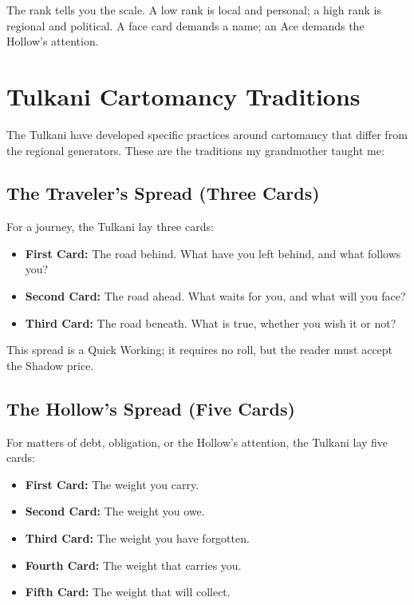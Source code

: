 \documentclass[11pt,letterpaper,twoside]{book}
\begin{document}
The rank tells you the scale. A low rank is local and personal; a high rank is regional and political. A face card demands a name; an Ace demands the Hollow's attention.

\section*{Tulkani Cartomancy Traditions}

The Tulkani have developed specific practices around cartomancy that differ from the regional generators. These are the traditions my grandmother taught me:

\subsection*{The Traveler's Spread (Three Cards)}

For a journey, the Tulkani lay three cards:
\begin{itemize}
    \item \textbf{First Card:} The road behind. What have you left behind, and what follows you?
    \item \textbf{Second Card:} The road ahead. What waits for you, and what will you face?
    \item \textbf{Third Card:} The road beneath. What is true, whether you wish it or not?
\end{itemize}

This spread is a Quick Working; it requires no roll, but the reader must accept the Shadow price.

\subsection*{The Hollow's Spread (Five Cards)}

For matters of debt, obligation, or the Hollow's attention, the Tulkani lay five cards:
\begin{itemize}
    \item \textbf{First Card:} The weight you carry.
    \item \textbf{Second Card:} The weight you owe.
    \item \textbf{Third Card:} The weight you have forgotten.
    \item \textbf{Fourth Card:} The weight that carries you.
    \item \textbf{Fifth Card:} The weight that will collect.
\end{itemize}
\end{document}
